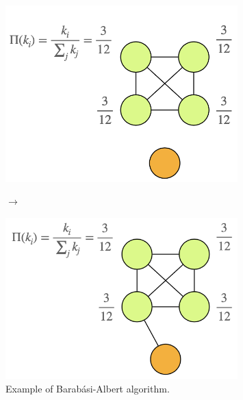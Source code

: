 \documentclass[../main/main.tex]{subfiles}
\begin{document}
\begin{figure}[h!]
\begin{minipage}[c]{0.48\linewidth}
\centering
\includegraphics[width=0.8\textwidth]{../lessons/image/06/6.png}
\end{minipage}
\( \longrightarrow  \)
\begin{minipage}[]{0.48\linewidth}
\centering
\includegraphics[width=0.8\textwidth]{../lessons/image/06/7.png}
\end{minipage}
\caption{\label{fig:06_5} Example of Barabási-Albert algorithm.}
\end{figure}
\end{document}
